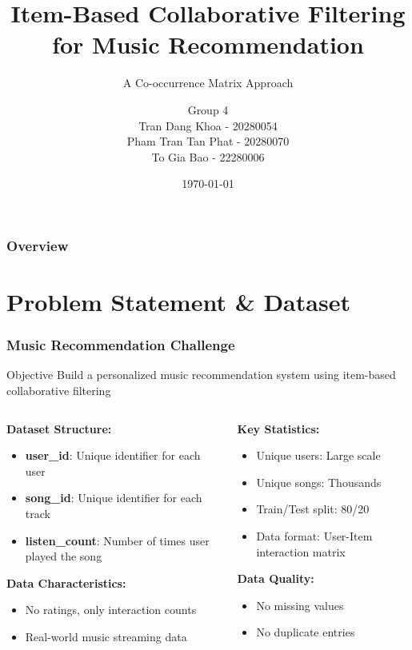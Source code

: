 \documentclass[11pt]{beamer}
\title{Item-Based Collaborative Filtering for Music Recommendation}
\subtitle{A Co-occurrence Matrix Approach}
\author{Group 4 \\ Tran Dang Khoa - 20280054 \\ Pham Tran Tan Phat - 20280070 \\ To Gia Bao - 22280006}
\date{\today}
\begin{document}
\frame{\titlepage}

\begin{frame}
\frametitle{Overview}
\tableofcontents
\end{frame}

\section{Problem Statement \& Dataset}

\begin{frame}
\frametitle{Music Recommendation Challenge}
\begin{block}{Objective}
Build a personalized music recommendation system using item-based collaborative filtering
\end{block}

\begin{columns}
\begin{column}{0.5\textwidth}
\textbf{Dataset Structure:}
\begin{itemize}
\item \textbf{user\_id}: Unique identifier for each user
\item \textbf{song\_id}: Unique identifier for each track
\item \textbf{listen\_count}: Number of times user played the song
\end{itemize}

\vspace{0.2cm}
\textbf{Data Characteristics:}
\begin{itemize}
\item No ratings, only interaction counts
\item Real-world music streaming data
\end{itemize}
\end{column}
\begin{column}{0.5\textwidth}
\textbf{Key Statistics:}
\begin{itemize}
\item Unique users: Large scale
\item Unique songs: Thousands
\item Train/Test split: 80/20
\item Data format: User-Item interaction matrix
\end{itemize}

\vspace{0.2cm}
\textbf{Data Quality:}
\begin{itemize}
\item No missing values
\item No duplicate entries
\end{itemize}
\end{column}
\end{columns}
\end{frame}
\end{document}
